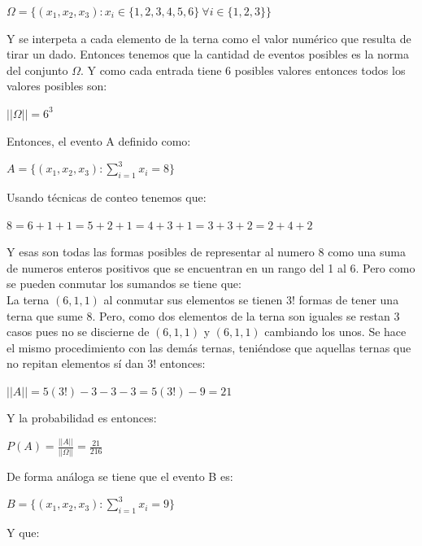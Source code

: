 \documentclass[12pt,a4paper]{report}
\begin{document}
\begin{enumerate}
{\begin{enumerate}[label=\alph*) ]
{    \begin{center}
    $\Omega = \lbrace (x_{1},x_{2},x_{3}) : x_{i} \in \lbrace 1,2,3,4,5,6 \rbrace \ \forall i\in \lbrace 1,2,3 \rbrace \rbrace$
    \end{center} 
    Y se interpeta a cada elemento de la terna como el valor numérico que resulta de tirar un dado. Entonces tenemos que la cantidad de eventos posibles es la norma del conjunto $\Omega$. Y como cada entrada tiene 6 posibles valores entonces todos los valores posibles son:\\
    \begin{center}
    $||\Omega|| = 6^3$
    \end{center}
    Entonces, el evento A definido como: \\
    \begin{center}
    $A= \lbrace (x_{1},x_{2},x_{3}) : \sum\limits_{i=1}^{3} x_{i} = 8 \rbrace$
    \end{center}
    Usando técnicas de conteo tenemos que:\\
    \begin{center}
    $8 = 6+1+1=5+2+1=4+3+1=3+3+2=2+4+2$
    \end{center}
    Y esas son todas las formas posibles de representar al numero 8 como una suma de numeros enteros positivos que se encuentran en un rango del 1 al 6. Pero como se pueden conmutar los sumandos se tiene que: \\
La terna $(6,1,1)$ al conmutar sus elementos se tienen $3!$ formas de tener una terna que sume 8. Pero, como dos elementos de la terna son iguales se restan 3 casos pues no se discierne de $(6,1,1)$ y $(6,1,1)$ cambiando los unos. Se hace el mismo procedimiento con las demás ternas, teniéndose que aquellas ternas que no repitan elementos sí dan $3!$ entonces:\\
\begin{center}
$||A||=5(3!)-3-3-3=5(3!)-9=21$
\end{center}
Y la probabilidad es entonces:\\
\begin{center}
$P(A)=\frac{||A||}{||\Omega||}=\frac{21}{216}$
\end{center}
De forma análoga se tiene que el evento B es:\\
\begin{center}
$B= \lbrace (x_{1},x_{2},x_{3}) : \sum\limits_{i=1}^{3} x_{i}=9 \rbrace$
\end{center}
Y que:\\
\begin{center}

\end{center}}
\end{enumerate}}
\end{enumerate}
\end{document}
